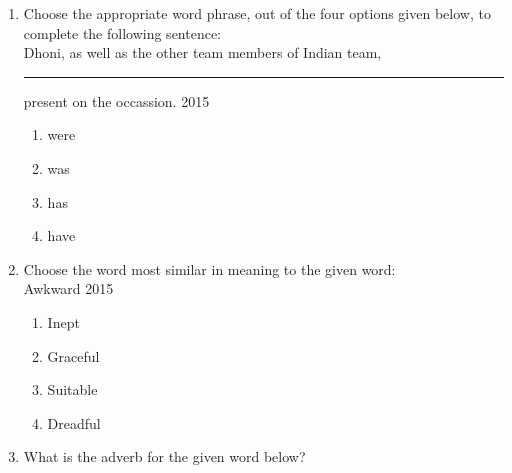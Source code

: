 \documentclass[journal]{IEEEtran}
\begin{document}
\begin{enumerate}
    

 
    \item  Choose the appropriate word phrase, out of the four options given below, to complete the following sentence:\\
    Dhoni, as well as the other team members of Indian team,\rule{1cm}{0.15mm} present on the occassion.
    \hfill{2015}
    \begin{multicols}{4}
        
    
\begin{enumerate}
    \item were 
    \item was
    \item has
    \item have
\end{enumerate}
   \end{multicols}
        
  \item   Choose the word most similar in meaning to the given word:\\Awkward
  \hfill{2015}
  \begin{multicols}{4}
    \begin{enumerate}
        \item Inept 
        \item Graceful
        \item Suitable
        \item Dreadful
    \end{enumerate}  
  \end{multicols}

 
  
  \item What is the adverb for the given word below?


\end{enumerate}
\end{document}
